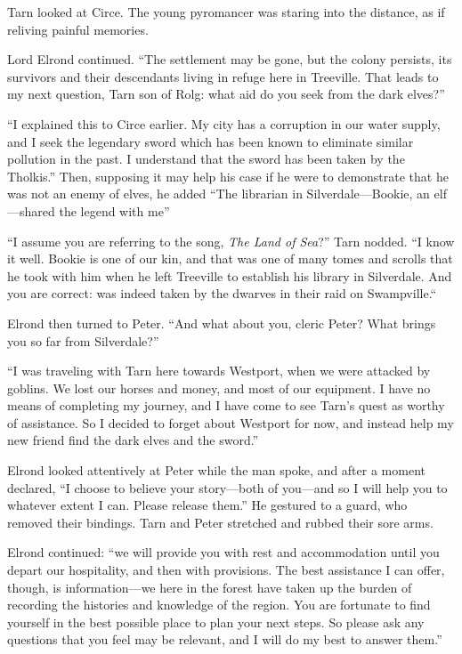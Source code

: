 Tarn looked at Circe.  The young pyromancer was staring into the distance, as if reliving painful memories.

Lord Elrond continued.  ``The settlement may be gone, but the colony persists, its survivors and their descendants living in refuge here in Treeville.  That leads to my next question, Tarn son of Rolg: what aid do you seek from the dark elves?''

``I explained this to Circe earlier.  My city has a corruption in our water supply, and I seek the legendary sword \kildir which has been known to eliminate similar pollution in the past.  I understand that the sword has been taken by the Tholkis.'' Then, supposing it may help his case if he were to demonstrate that he was not an enemy of elves, he added ``The librarian in Silverdale---Bookie, an elf---shared the legend with me''

``I assume you are referring to the song, \emph{The Land of Sea}?''
Tarn nodded.
``I know it well.  Bookie is one of our kin, and that was one of many tomes and scrolls that he took with him when he left Treeville to establish his library in Silverdale.  And you are correct: \kildir was indeed taken by the dwarves in their raid on Swampville.``

Elrond then turned to Peter.  ``And what about you, cleric Peter?  What brings you so far from Silverdale?''

``I was traveling with Tarn here towards Westport, when we were attacked by goblins.  We lost our horses and money, and most of our equipment.  I have no means of completing my journey, and I have come to see Tarn's quest as worthy of assistance.  So I decided to forget about Westport for now, and instead help my new friend find the dark elves and the sword.''

Elrond looked attentively at Peter while the man spoke, and after a moment declared, ``I choose to believe your story---both of you---and so I will help you to whatever extent I can.  Please release them.'' He gestured to a guard, who removed their bindings.  Tarn and Peter stretched and rubbed their sore arms.

Elrond continued: ``we will provide you with rest and accommodation until you depart our hospitality, and then with provisions.  The best assistance I can offer, though, is information---we here in the forest have taken up the burden of recording the histories and knowledge of the region.  You are fortunate to find yourself in the best possible place to plan your next steps.  So please ask any questions that you feel may be relevant, and I will do my best to answer them.''

